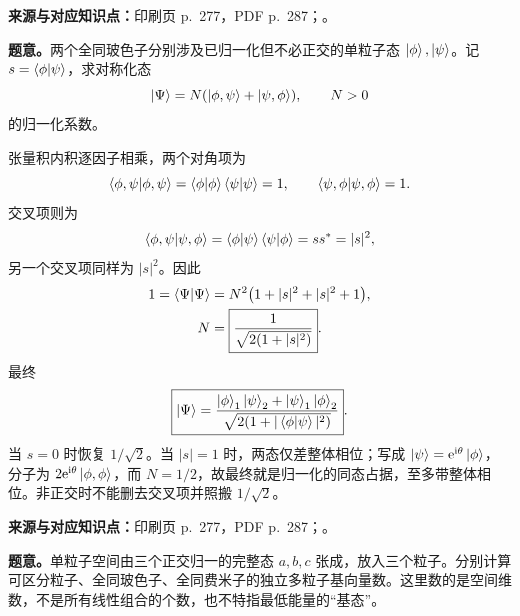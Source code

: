 \textbf{来源与对应知识点：}印刷页 p.~277，PDF p.~287；。

\textbf{题意。}两个全同玻色子分别涉及已归一化但不必正交的单粒子态 $\left|\phi\right\rangle,\left|\psi\right\rangle$。记 $s=\left\langle \phi \middle| \psi \right\rangle$，求对称化态
\begin{equation}
  \left|\Psi\right\rangle=N(\left|\phi,\psi\right\rangle+\left|\psi,\phi\right\rangle),\qquad N>0
\end{equation}
的归一化系数。

\begin{checkedsolution}
张量积内积逐因子相乘，两个对角项为
\begin{equation}
  \left\langle \phi,\psi \middle| \phi,\psi \right\rangle
    =\left\langle \phi \middle| \phi \right\rangle\left\langle \psi \middle| \psi \right\rangle=1,
  \qquad \left\langle \psi,\phi \middle| \psi,\phi \right\rangle=1.
\end{equation}
交叉项则为
\begin{equation}
  \left\langle \phi,\psi \middle| \psi,\phi \right\rangle
   =\left\langle \phi \middle| \psi \right\rangle\left\langle \psi \middle| \phi \right\rangle=ss^*=|s|^2,
\end{equation}
另一个交叉项同样为 $|s|^2$。因此
\begin{align}
  1=\left\langle \Psi \middle| \Psi \right\rangle
   &=N^2\bigl(1+|s|^2+|s|^2+1\bigr),\\
  N&=\boxed{\frac1{\sqrt{2(1+|s|^2)}}}.
\end{align}
最终
\begin{equation}
  \boxed{\left|\Psi\right\rangle=
   \frac{\left|\phi\right\rangle_1\left|\psi\right\rangle_2+\left|\psi\right\rangle_1\left|\phi\right\rangle_2}
        {\sqrt{2(1+|\left\langle \phi \middle| \psi \right\rangle|^2)}}}.
\end{equation}
当 $s=0$ 时恢复 $1/\sqrt2$。当 $|s|=1$ 时，两态仅差整体相位；写成 $\left|\psi\right\rangle=\mathrm{e}^{\mathrm{i}\theta}\left|\phi\right\rangle$，分子为 $2\mathrm{e}^{\mathrm{i}\theta}\left|\phi,\phi\right\rangle$，而 $N=1/2$，故最终就是归一化的同态占据，至多带整体相位。非正交时不能删去交叉项并照搬 $1/\sqrt2$。
\end{checkedsolution}

\textbf{来源与对应知识点：}印刷页 p.~277，PDF p.~287；。

\textbf{题意。}单粒子空间由三个正交归一的完整态 $a,b,c$ 张成，放入三个粒子。分别计算可区分粒子、全同玻色子、全同费米子的独立多粒子基向量数。这里数的是空间维数，不是所有线性组合的个数，也不特指最低能量的“基态”。

